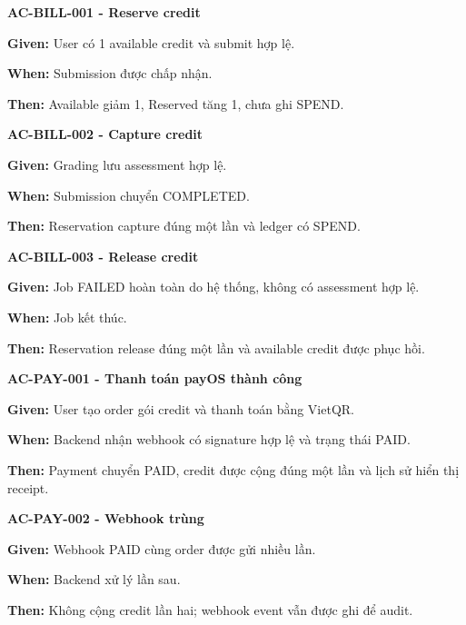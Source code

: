 \documentclass[11pt,a4paper]{article}
\begin{document}
\begin{acceptancebox}
\textbf{AC-BILL-001 - Reserve credit}\par
\textbf{Given:} User có 1 available credit và submit hợp lệ.\par
\textbf{When:} Submission được chấp nhận.\par
\textbf{Then:} Available giảm 1, Reserved tăng 1, chưa ghi SPEND.
\end{acceptancebox}

\begin{acceptancebox}
\textbf{AC-BILL-002 - Capture credit}\par
\textbf{Given:} Grading lưu assessment hợp lệ.\par
\textbf{When:} Submission chuyển COMPLETED.\par
\textbf{Then:} Reservation capture đúng một lần và ledger có SPEND.
\end{acceptancebox}

\begin{acceptancebox}
\textbf{AC-BILL-003 - Release credit}\par
\textbf{Given:} Job FAILED hoàn toàn do hệ thống, không có assessment hợp lệ.\par
\textbf{When:} Job kết thúc.\par
\textbf{Then:} Reservation release đúng một lần và available credit được phục hồi.
\end{acceptancebox}

\begin{acceptancebox}
\textbf{AC-PAY-001 - Thanh toán payOS thành công}\par
\textbf{Given:} User tạo order gói credit và thanh toán bằng VietQR.\par
\textbf{When:} Backend nhận webhook có signature hợp lệ và trạng thái PAID.\par
\textbf{Then:} Payment chuyển PAID, credit được cộng đúng một lần và lịch sử hiển thị receipt.
\end{acceptancebox}

\begin{acceptancebox}
\textbf{AC-PAY-002 - Webhook trùng}\par
\textbf{Given:} Webhook PAID cùng order được gửi nhiều lần.\par
\textbf{When:} Backend xử lý lần sau.\par
\textbf{Then:} Không cộng credit lần hai; webhook event vẫn được ghi để audit.
\end{acceptancebox}
\end{document}
